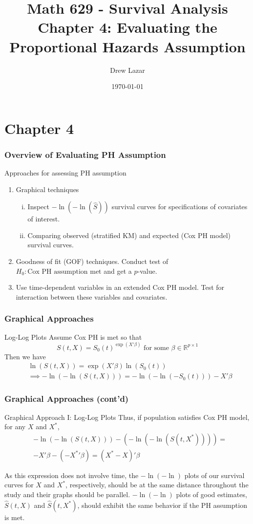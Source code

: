 \documentclass{beamer}
\title{Math 629 - Survival Analysis \\ Chapter 4: Evaluating the Proportional Hazards Assumption}
\author{Drew Lazar}
\institute{Ball State University}
\date{\today}
\theoremstyle{definition}
\begin{document}
\begin{frame}
    \titlepage
\end{frame}



\section{Chapter 4}
\begin{frame}
\frametitle{Overview of Evaluating PH Assumption}
\begin{block}{Approaches for assessing PH assumption}
\begin{enumerate}
\item Graphical techniques
\begin{enumerate}[i.]
\item Inspect $-\ln(-\ln(\hat{S}))$ survival curves for specifications of covariates of interest.
\item Comparing observed (stratified KM) and expected (Cox PH model) survival curves.
\end{enumerate}
\item Goodness of fit (GOF) techniques. Conduct test of $H_0: \text{Cox PH assumption met}$ and get a $p$-value.
\item Use time-dependent variables in an extended Cox PH model. Test for interaction between these variables and covariates.
\end{enumerate}
\end{block}
\end{frame}
\begin{frame}
\frametitle{Graphical Approaches}
\begin{block}{Log-Log Plots}
Assume Cox PH is met so that
\[ S(t,X) = S_0(t)^{\exp(X'\beta)} \text{ for some }  \beta \in \mathbb{R}^{p\times1}
\]
Then we have
\begin{align*}
&\ln( S(t,X)) = \exp(X'\beta)\ln(S_0(t)) \\
&\implies -\ln(-\ln(S(t,X))) = -\ln(-\ln(-S_0(t))) - X'\beta
\end{align*}
\end{block}
\end{frame}

\begin{frame}
\frametitle{Graphical Approaches (cont'd)}
\begin{block}{Graphical Approach I: Log-Log Plots}
Thus, if population satisfies Cox PH model, for any $X$ and $X^*$,
\begin{align*}
&-\ln(-\ln(S(t,X)))- (-\ln(-\ln(S(t,X^*)))) = \\
&-X'\beta - (-{X^*}'\beta) =(X^*-X)'\beta
\end{align*}
\end{block}
As this expression does not involve time, the  $-\ln(-\ln)$ plots of our survival curves for $X$ and $X^*$, respectively, should be at the same distance throughout the study and their graphs should be parallel. $-\ln(-\ln)$ plots of good estimates, $\hat{S}(t,X)$ and $\hat{S}(t,X^*)$, should exhibit the same behavior if the PH assumption is met. 
\end{frame}
\end{document}
